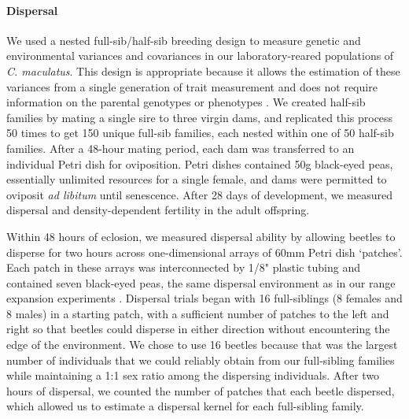 \paragraph{Dispersal}
We used a nested full-sib/half-sib breeding design to measure genetic and environmental variances and covariances in our laboratory-reared populations of \textit{C. maculatus}. This design is appropriate because it allows the estimation of these variances from a single generation of trait measurement and does not require information on the parental genotypes or phenotypes \citep{falconer_introduction_1996,conner_primer_2004,wilson_ecologists_2010}. We created half-sib families by mating a single sire to three virgin dams, and replicated this process 50 times to get 150 unique full-sib families, each nested within one of 50 half-sib families. After a 48-hour mating period, each dam was transferred to an individual Petri dish for oviposition. Petri dishes contained 50g black-eyed peas, essentially unlimited resources for a single female, and dams were permitted to oviposit \textit{ad libitum} until senescence. After 28 days of development, we measured dispersal and density-dependent fertility in the adult offspring.

Within 48 hours of eclosion, we measured dispersal ability by allowing beetles to disperse for two hours across one-dimensional arrays of 60mm Petri dish `patches'. Each patch in these arrays was interconnected by 1/8" plastic tubing and contained seven black-eyed peas, the same dispersal environment as in our range expansion experiments \citep{ochocki_rapid_2017}. Dispersal trials began with 16 full-siblings (8 females and 8 males) in a starting patch, with a sufficient number of patches to the left and right so that beetles could disperse in either direction without encountering the edge of the environment. We chose to use 16 beetles because that was the largest number of individuals that we could reliably obtain from our full-sibling families while maintaining a 1:1 sex ratio among the dispersing individuals. After two hours of dispersal, we counted the number of patches that each beetle dispersed, which allowed us to estimate a dispersal kernel for each full-sibling family.

